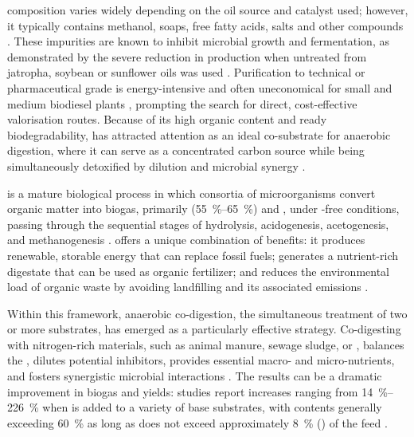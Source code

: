  composition varies widely depending on the oil source and catalyst used; however, it typically contains methanol, soaps, free fatty acids, salts and other  compounds \parencite{anand2012, attarbachi2023}. These impurities are known to inhibit microbial growth and fermentation, as demonstrated by the severe reduction in  production when untreated  from jatropha, soybean or sunflower oils was used \parencite{anand2012}. Purification to technical or pharmaceutical grade is energy-intensive and often uneconomical for small and medium biodiesel plants \parencite{attarbachi2023}, prompting the search for direct, cost-effective valorisation routes. Because of its high organic content and ready biodegradability,  has attracted attention as an ideal co-substrate for anaerobic digestion, where it can serve as a concentrated carbon source while being simultaneously detoxified by dilution and microbial synergy \parencite{gebreegziabher2025, tomczak2025}.

 is a mature biological process in which consortia of microorganisms convert organic matter into biogas, primarily  (\qtyrange{55}{65}{\percent}) and , under -free conditions, passing through the sequential stages of hydrolysis, acidogenesis, acetogenesis, and methanogenesis \parencite{gebreegziabher2025}.  offers a unique combination of benefits: it produces renewable, storable energy that can replace fossil fuels; generates a nutrient-rich digestate that can be used as organic fertilizer; and reduces the environmental load of organic waste by avoiding landfilling and its associated  emissions \parencite{scherhaufer2018, gebreegziabher2025}.

Within this framework, anaerobic co-digestion, the simultaneous treatment of two or more substrates, has emerged as a particularly effective strategy. Co-digesting  with nitrogen-rich materials, such as animal manure, sewage sludge, or , balances the , dilutes potential inhibitors, provides essential macro- and micro-nutrients, and fosters synergistic microbial interactions \parencite{tomczak2025, gebreegziabher2025}. The results can be a dramatic improvement in biogas and  yields: studies report increases ranging from \qtyrange{14}{226}{\percent} when  is added to a variety of base substrates, with  contents generally exceeding \qty{60}{\percent} as long as  does not exceed approximately \qty{8}{\percent} () of the feed \parencite{gebreegziabher2025, tomczak2025}.

